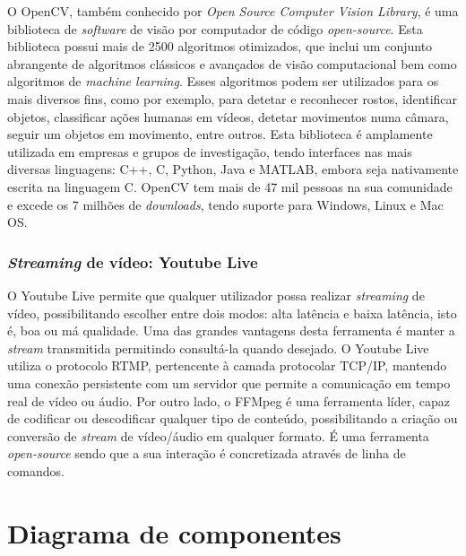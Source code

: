 O OpenCV, também conhecido por \textit{Open Source Computer Vision Library}, é uma biblioteca de \textit{software} de visão por computador de código \textit{open-source}. Esta biblioteca possui mais de 2500 algoritmos otimizados, que inclui um conjunto abrangente de algoritmos clássicos e avançados de visão computacional bem como algoritmos de \textit{machine learning}. Esses algoritmos podem ser utilizados para os mais diversos fins, como por exemplo, para detetar e reconhecer rostos, identificar objetos, classificar ações humanas em vídeos, detetar movimentos numa câmara, seguir um objetos em movimento, entre outros. Esta biblioteca é amplamente utilizada em empresas e grupos de investigação, tendo interfaces nas mais diversas linguagens: C++, C, Python, Java e MATLAB, embora seja nativamente escrita na linguagem C. OpenCV tem mais de 47 mil pessoas na sua comunidade e excede os 7 milhões de \textit{downloads}, tendo suporte para Windows, Linux e Mac OS\cite{Itseez}.



\subsubsection{\textit{Streaming} de vídeo: Youtube Live}

 O Youtube Live permite que qualquer utilizador possa realizar \textit{streaming} de vídeo, possibilitando escolher entre dois modos: alta latência e baixa latência, isto é, boa ou má qualidade. Uma das grandes vantagens desta ferramenta é manter a \textit{stream} transmitida permitindo consultá-la quando desejado. O Youtube Live utiliza o protocolo \ac{RTMP}, pertencente à camada protocolar TCP/IP, mantendo uma conexão persistente com um servidor que permite a comunicação em tempo real de vídeo ou áudio. Por outro lado, o FFMpeg é uma ferramenta líder, capaz de codificar ou descodificar qualquer tipo de conteúdo, possibilitando a criação ou conversão de \textit{stream} de vídeo/áudio em qualquer formato. É uma ferramenta \textit{open-source} sendo que a sua interação é concretizada através de linha de comandos\cite{FFmpeg2015}. 







\section{Diagrama de componentes}


